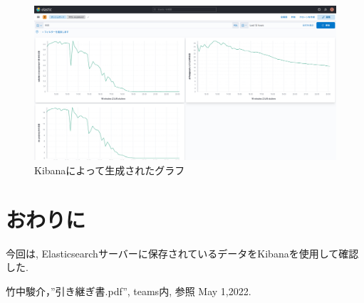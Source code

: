 \documentclass[a4j,12pt,]{jarticle}
\begin{document}
\begin{figure}[H]
  \begin{center}
    \includegraphics[width=160mm]{graph.png}
    \caption{Kibanaによって生成されたグラフ}
    \label{p3}
  \end{center}
\end{figure}

\section{おわりに}
今回は, Elasticsearchサーバーに保存されているデータをKibanaを使用して確認した.

\begin{thebibliography}{5}
  竹中駿介，”引き継ぎ書.pdf”, teams内, 参照 May 1,2022.
\end{thebibliography}
\end{document}
